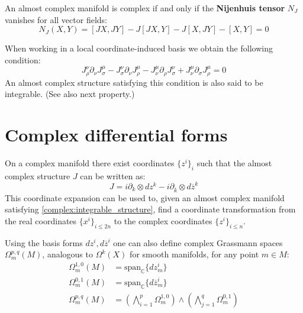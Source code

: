 	\begin{theorem}
		An almost complex manifold is complex if and only if the \textbf{Nijenhuis tensor} $N_J$ vanishes for all vector fields:
		\begin{equation}
			\label{complex:integrable_structure}
			N_J(X, Y) = [JX, JY] - J[JX, Y] - J[X, JY] - [X, Y] = 0
		\end{equation}
	\end{theorem}
	When working in a local coordinate-induced basis we obtain the following condition:
	\begin{equation}
		J_\rho^\nu\partial_\nu J_\sigma^\mu - J_\sigma^\nu\partial_\nu J_\rho^\mu - J_\nu^\mu\partial_\rho J_\sigma^\nu + J_\nu^\mu\partial_\sigma J_\rho^\mu = 0
	\end{equation}
	An almost complex structure satisfying this condition is also said to be integrable. (See also next property.)
	
\section{Complex differential forms}
	
	\begin{property}
		On a complex manifold there exist coordinates $\{z^i\}_i$ such that the almost complex structure $J$ can be written as:
		\begin{equation}
			J = i\partial_k\otimes dz^k - i\partial_{\overline{k}}\otimes d\overline{z}^k
		\end{equation}
		This coordinate expansion can be used to, given an almost complex manifold satisfying \ref{complex:integrable_structure}, find a coordinate transformation from the real coordinates $\{x^i\}_{i\leq2n}$ to the complex coordinates $\{z^i\}_{i\leq n}$.
	\end{property}

	Using the basis forms $dz^i, d\overline{z}^i$ one can also define complex Grassmann spaces $\Omega^{p, q}_m(M)$, analogous to $\Omega^k(X)$ for smooth manifolds, for any point $m\in M$:
	\begin{align}
		\Omega^{1, 0}_m(M) &= \text{span}_{\mathbb{C}}\{dz^i_m\}\\
		\Omega^{0, 1}_m(M) &= \text{span}_{\mathbb{C}}\{d\overline{z}^i_m\}\\
		\Omega^{p, q}_m(M) &= \left(\bigwedge_{i=1}^p\Omega^{1, 0}_m\right)\wedge\left(\bigwedge_{j=1}^q\Omega^{0, 1}_m\right)
	\end{align}
	
